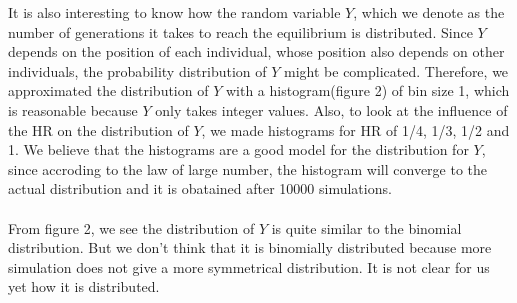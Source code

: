 \documentclass{article}
\begin{document}
It is also interesting to know how the random variable $Y$, which we denote as the number of generations it takes to reach the equilibrium is distributed. Since $Y$ depends on the position of each individual, whose position also depends on other individuals, the probability distribution of $Y$ might be complicated. Therefore, we approximated the distribution of $Y$ with a histogram(figure 2) of bin size 1, which is reasonable because $Y$ only takes integer values. Also, to look at the influence of the HR on the distribution of $Y$, we made histograms for HR of 1/4, 1/3, 1/2 and 1.  We believe that the histograms are a good model for the distribution for $Y$, since accroding to the law of large number, the histogram will converge to the actual distribution and it is obatained after 10000 simulations.\\
\\
From figure 2, we see the distribution of $Y$ is quite similar to the binomial distribution. But we don't think that it is binomially distributed because more simulation does not give a more symmetrical distribution. It is not clear for us yet how it is distributed. 
\end{document}
